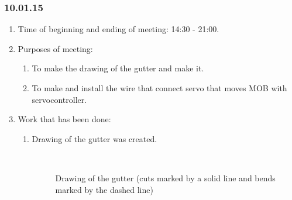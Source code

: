 \subsubsection{10.01.15}
\begin{enumerate}
	
	\item Time of beginning and ending of meeting: 14:30 - 21:00.
	
	\item Purposes of meeting: 
	\begin{enumerate}
		
	  \item To make the drawing of the gutter and make it.
		
      \item To make and install the wire that connect servo that moves MOB with servocontroller.
		
	\end{enumerate}

	\item Work that has been done:
	\begin{enumerate}
		
		\item Drawing of the gutter was created.
		\begin{figure}[H]
			\begin{minipage}[h]{0.2\linewidth}
				\center  
			\end{minipage}
			\begin{minipage}[h]{0.6\linewidth}
				\caption{Drawing of the gutter (cuts marked by a solid line and bends marked by the dashed line)}
			\end{minipage}
		\end{figure}
		

\end{enumerate}
\end{enumerate}
